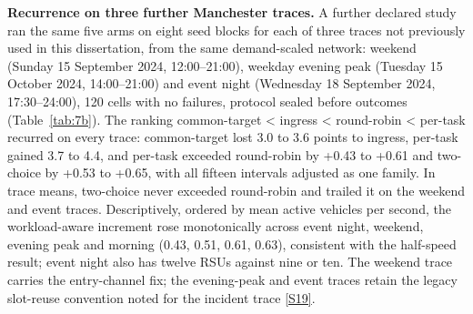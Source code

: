 \documentclass[12pt,a4paper]{article}
\begin{document}
\textbf{Recurrence on three further Manchester traces.} A further declared study ran the same five arms on eight seed blocks for each of three traces not previously used in this dissertation, from the same demand-scaled network: weekend (Sunday 15 September 2024, 12:00--21:00), weekday evening peak (Tuesday 15 October 2024, 14:00--21:00) and event night (Wednesday 18 September 2024, 17:30--24:00), 120 cells with no failures, protocol sealed before outcomes (Table~\ref{tab:7b}). The ranking common-target < ingress < round-robin < per-task recurred on every trace: common-target lost 3.0 to 3.6 points to ingress, per-task gained 3.7 to 4.4, and per-task exceeded round-robin by +0.43 to +0.61 and two-choice by +0.53 to +0.65, with all fifteen intervals adjusted as one family. In trace means, two-choice never exceeded round-robin and trailed it on the weekend and event traces. Descriptively, ordered by mean active vehicles per second, the workload-aware increment rose monotonically across event night, weekend, evening peak and morning (0.43, 0.51, 0.61, 0.63), consistent with the half-speed result; event night also has twelve RSUs against nine or ten. The weekend trace carries the entry-channel fix; the evening-peak and event traces retain the legacy slot-reuse convention noted for the incident trace \hyperref[source-s19]{[S19]}.
\end{document}
